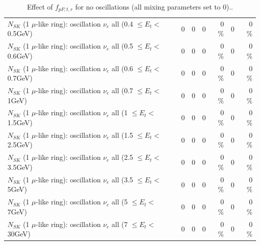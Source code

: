 \begin{table}
\begin{tabular}{| l | r | r | r  r | r  r |}
$N_{SK}$ (1 $\mu$-like ring): oscillation $\nu_{e}$ all (0.4 $\leq E_{t} <$ 0.5GeV) &               0 &               0 &               0 &        0 \%  &               0 &        0 \%  \\ 
$N_{SK}$ (1 $\mu$-like ring): oscillation $\nu_{e}$ all (0.5 $\leq E_{t} <$ 0.6GeV) &               0 &               0 &               0 &        0 \%  &               0 &        0 \%  \\ 
$N_{SK}$ (1 $\mu$-like ring): oscillation $\nu_{e}$ all (0.6 $\leq E_{t} <$ 0.7GeV) &               0 &               0 &               0 &        0 \%  &               0 &        0 \%  \\ 
$N_{SK}$ (1 $\mu$-like ring): oscillation $\nu_{e}$ all (0.7 $\leq E_{t} <$ 1GeV) &               0 &               0 &               0 &        0 \%  &               0 &        0 \%  \\ 
$N_{SK}$ (1 $\mu$-like ring): oscillation $\nu_{e}$ all (1 $\leq E_{t} <$ 1.5GeV) &               0 &               0 &               0 &        0 \%  &               0 &        0 \%  \\ 
$N_{SK}$ (1 $\mu$-like ring): oscillation $\nu_{e}$ all (1.5 $\leq E_{t} <$ 2.5GeV) &               0 &               0 &               0 &        0 \%  &               0 &        0 \%  \\ 
$N_{SK}$ (1 $\mu$-like ring): oscillation $\nu_{e}$ all (2.5 $\leq E_{t} <$ 3.5GeV) &               0 &               0 &               0 &        0 \%  &               0 &        0 \%  \\ 
$N_{SK}$ (1 $\mu$-like ring): oscillation $\nu_{e}$ all (3.5 $\leq E_{t} <$ 5GeV) &               0 &               0 &               0 &        0 \%  &               0 &        0 \%  \\ 
 $N_{SK}$ (1 $\mu$-like ring): oscillation $\nu_{e}$ all (5 $\leq E_{t} <$ 7GeV) &               0 &               0 &               0 &        0 \%  &               0 &        0 \%  \\ 
$N_{SK}$ (1 $\mu$-like ring): oscillation $\nu_{e}$ all (7 $\leq E_{t} <$ 30GeV) &               0 &               0 &               0 &        0 \%  &               0 &        0 \%  \\ 
\hline
\hline
\end{tabular}
\caption{ Effect of $f_{pF; t, r}$ for no oscillations (all mixing parameters set to 0).. }
\label{tab:num_xsec_pf_1RmuT_3f_osc_t13:0}
\end{table}
\clearpage
